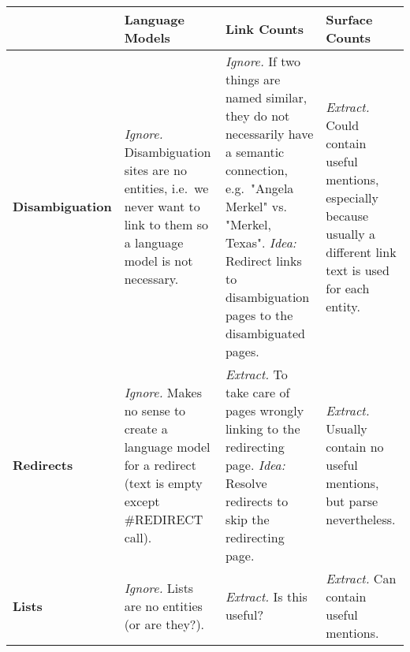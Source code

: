 \documentclass[a4paper, landscape]{article}
\begin{document}
\begin{longtable}{p{3cm}p{5cm}p{5cm}p{5cm}}
	\toprule
	& \textbf{Language Models} & \textbf{Link Counts} & \textbf{Surface Counts} \\

	\midrule
	\textbf{Disambiguation}
		& \emph{\checkmark Ignore.} Disambiguation sites are no entities, i.e.\ we never want to link to them so a language model is not necessary.
		& \emph{\checkmark Ignore.} If two things are named similar, they do not necessarily have a semantic connection, e.g.\ "Angela Merkel" vs. "Merkel, Texas". \emph{Idea:} Redirect links to disambiguation pages to the disambiguated pages.
		& \emph{\checkmark Extract.} Could contain useful mentions, especially because usually a different link text is used for each entity.  \\
	\textbf{Redirects}
		& \emph{\checkmark Ignore.} Makes no sense to create a language model for a redirect (text is empty except \mbox{\#REDIRECT} call).
		& \emph{\checkmark Extract.} To take care of pages wrongly linking to the redirecting page. \emph{Idea:} Resolve redirects to skip the redirecting page.
		& \emph{\checkmark Extract.} Usually contain no useful mentions, but parse nevertheless. \\
	\textbf{Lists}
		& \emph{\checkmark Ignore.} Lists are no entities (or are they?).
		& \emph{\checkmark Extract.} Is this useful?
		& \emph{\checkmark Extract.} Can contain useful mentions.

	\\\bottomrule
\end{longtable}
\end{document}
